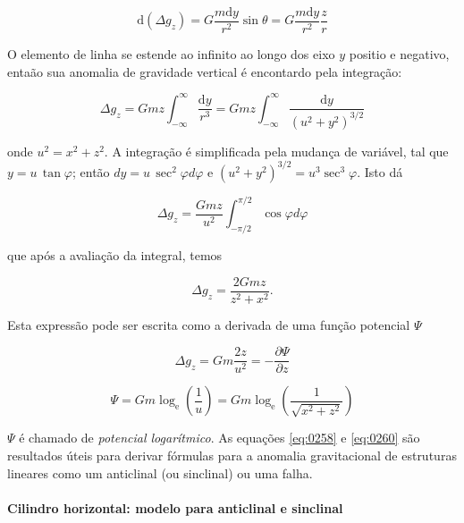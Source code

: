 \documentclass[]{book}
\let\oldparagraph\paragraph
\renewcommand{\paragraph}[1]{\oldparagraph{#1}\mbox{}}
\theoremstyle{definition}
\theoremstyle{definition}
\theoremstyle{definition}
\theoremstyle{remark}
\begin{document}
\begin{equation}
\mathrm{d}\left(\Delta g_{z}\right)=G \frac{m \mathrm{d} y}{r^{2}} \sin \theta=G \frac{m \mathrm{d} y}{r^{2}} \frac{z}{r} \label{eq:0255}
\end{equation}

O elemento de linha se estende ao infinito ao longo dos eixo \(y\) positio e negativo, entaão sua anomalia de gravidade vertical é encontardo pela integração:

\begin{equation}
\Delta g_{z}=G m z \int_{-\infty}^{\infty} \frac{\mathrm{d} y}{r^{3}}=G m z \int_{-\infty}^{\infty} \frac{\mathrm{d} y}{\left(u^{2}+y^{2}\right)^{3 / 2}} \label{eq:0256}
\end{equation}

onde \(u^2=x^2+z^2\). A integração é simplificada pela mudança de variável, tal que \(y=u\,\tan{\varphi}\); então \(dy=u\,\sec^2{\varphi}d\varphi\) e \(\left(u^{2}+y^{2}\right)^{3 / 2}=u^{3} \sec ^{3} \varphi\). Isto dá

\begin{equation}
\Delta g_{z}=\frac{G m z}{u^{2}} \int_{-\pi / 2}^{\pi / 2} \cos \varphi d \varphi  \label{eq:0257}
\end{equation}

que após a avaliação da integral, temos

\begin{equation}
\Delta g_{z}=\frac{2 G m z}{z^{2}+x^{2}}.  \label{eq:0258}
\end{equation}

Esta expressão pode ser escrita como a derivada de uma função potencial \(\Psi\)

\begin{equation}
\Delta g_{z}=G m \frac{2 z}{u^{2}}=-\frac{\partial \Psi}{\partial z} \label{eq:0259}
\end{equation}

\begin{equation}
\Psi=G m \log _{\mathrm{e}}\left(\frac{1}{u}\right)=G m \log _{\mathrm{e}}\left(\frac{1}{\sqrt{x^{2}+z^{2}}}\right) \label{eq:0260}
\end{equation}

\(\Psi\) é chamado de \emph{potencial logarítmico}. As equações \eqref{eq:0258} e \eqref{eq:0260} são resultados úteis para derivar fórmulas para a anomalia gravitacional de estruturas lineares como um anticlinal (ou sinclinal) ou uma falha.

\hypertarget{cilindro-horizontal-modelo-para-anticlinal-e-sinclinal}{%
\paragraph{Cilindro horizontal: modelo para anticlinal e sinclinal}\label{cilindro-horizontal-modelo-para-anticlinal-e-sinclinal}}
\end{document}
